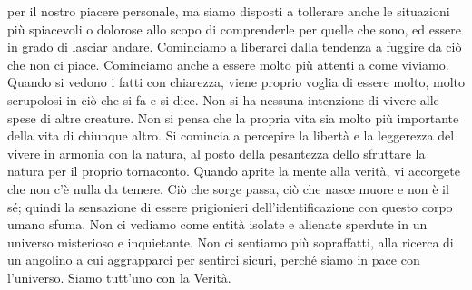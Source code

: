 per il nostro piacere personale, ma siamo disposti a tollerare anche le
situazioni più spiacevoli o dolorose allo scopo di comprenderle per
quelle che sono, ed essere in grado di lasciar andare. Cominciamo a
liberarci dalla tendenza a fuggire da ciò che non ci piace. Cominciamo
anche a essere molto più attenti a come viviamo. Quando si vedono i
fatti con chiarezza, viene proprio voglia di essere molto, molto
scrupolosi in ciò che si fa e si dice. Non si ha nessuna intenzione di
vivere alle spese di altre creature. Non si pensa che la propria vita
sia molto più importante della vita di chiunque altro. Si comincia a
percepire la libertà e la leggerezza del vivere in armonia con la
natura, al posto della pesantezza dello sfruttare la natura per il
proprio tornaconto. Quando aprite la mente alla verità, vi accorgete che
non c'è nulla da temere. Ciò che sorge passa, ciò che nasce muore e non
è il sé; quindi la sensazione di essere prigionieri dell'identificazione
con questo corpo umano sfuma. Non ci vediamo come entità isolate e
alienate sperdute in un universo misterioso e inquietante. Non ci
sentiamo più sopraffatti, alla ricerca di un angolino a cui aggrapparci
per sentirci sicuri, perché siamo in pace con l'universo. Siamo tutt'uno
con la Verità.

